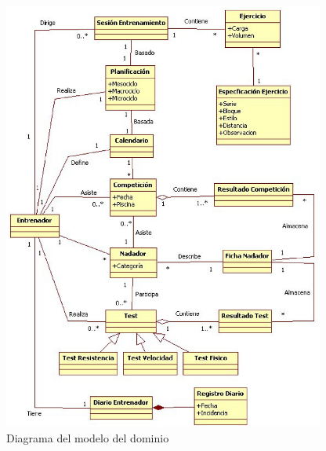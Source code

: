 	 
	\begin{figure}
	  \centering
	    \includegraphics[width=400px]{./eps/captreq_modelo_dominio.eps}
	  \caption{Diagrama del modelo del dominio}
	  \label{fig:modelo_dominio}
	\end{figure}


